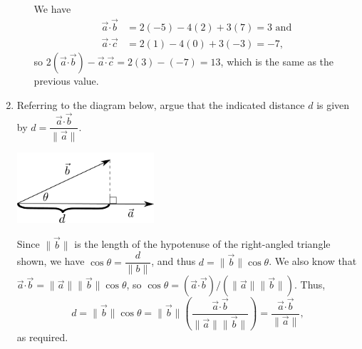 \documentclass[12pt]{article}
\newcommand{\len}[1]{\lVert #1\rVert}
\newcommand{\dotp}{\boldsymbol{\cdot}}
\begin{document}
\begin{enumerate}
\begin{enumerate}
\medskip

We have
\begin{align*}
 \vec{a}\dotp \vec{b} &= 2(-5)-4(2)+3(7) = 3 \text{ and}\\
 \vec{a}\dotp \vec{c} &= 2(1)-4(0)+3(-3) = -7,
\end{align*}
so $2(\vec{a}\dotp \vec{b}) - \vec{a}\dotp\vec{c} = 2(3)-(-7) = 13$, which is the same as the previous value.

\end{enumerate}

\item Referring to the diagram below, argue that the indicated distance $d$ is given by $d = \dfrac{\vec{a}\dotp\vec{b}}{\len{\vec{a}}}$.

\bigskip

\begin{multicols}{2}
\begin{flushleft}
 \includegraphics[width=2in]{WS2_proj}
\end{flushleft}
\columnbreak

Since $\len{\vec{b}}$ is the length of the hypotenuse of the right-angled triangle shown, we have $\cos\theta = \dfrac{d}{\len{b}}$, and thus $d=\len{\vec{b}}\cos\theta$. We also know that $\vec{a}\dotp\vec{b} = \len{\vec{a}}\len{\vec{b}}\cos\theta$, so $\cos\theta = (\vec{a}\dotp \vec{b})/(\len{\vec{a}}\len{\vec{b}})$. Thus,
\[
 d = \len{\vec{b}}\cos\theta = \len{\vec{b}}\left(\frac{\vec{a}\dotp \vec{b}}{\len{\vec{a}}\len{\vec{b}}}\right) = \dfrac{\vec{a}\dotp\vec{b}}{\len{\vec{a}}},
\]
as required.
\end{multicols}



 \end{enumerate}
\end{document}
